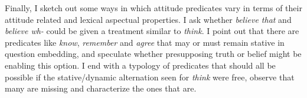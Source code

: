 Finally, I sketch out some ways in which attitude predicates vary in terms of their attitude related and lexical aspectual properties. I ask whether \textit{believe that} and \textit{believe wh-} could be given a treatment similar to \textit{think}. I point out that there are predicates like \textit{know}, \textit{remember} and \textit{agree} that may or must remain stative in question embedding, and speculate whether presupposing truth or belief might be enabling this option. I end with a typology of predicates that should all be possible if the stative/dynamic alternation seen for \textit{think} were free, observe that many are missing and characterize the ones that are.
\endinput